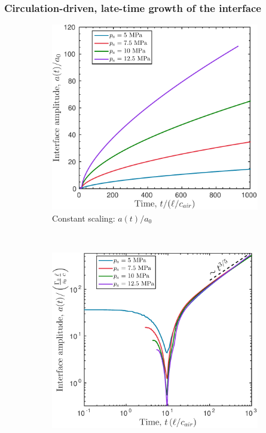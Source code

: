 \subsubsection{Circulation-driven, late-time growth of the interface}
\begin{figure}
  \centering
  \begin{subfigure}[t]{0.45\textwidth}
    \centering
    \includegraphics[height=0.8\textwidth]{./figs/lung_figs/a0_t1000_23-Dec-2016}
    \caption{\label{fig:trapz_interface_t1000} Constant scaling: $a(t)/a_0$}
  \end{subfigure}
  ~
  \begin{subfigure}[t]{0.45\textwidth}
    \centering
    \includegraphics[height=0.8\textwidth]{./figs/lung_figs/intf_amp_t1000_23-Dec-2016}

\end{subfigure}
\end{figure}
